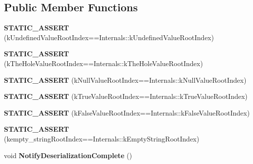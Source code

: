\subsection*{Public Member Functions}
\begin{DoxyCompactItemize}
\item 
{\bfseries S\+T\+A\+T\+I\+C\+\_\+\+A\+S\+S\+E\+RT} (k\+Undefined\+Value\+Root\+Index==Internals\+::k\+Undefined\+Value\+Root\+Index)\hypertarget{classv8_1_1internal_1_1_heap_ab0f67a64a053865074f8e45ed99540b0}{}\label{classv8_1_1internal_1_1_heap_ab0f67a64a053865074f8e45ed99540b0}

\item 
{\bfseries S\+T\+A\+T\+I\+C\+\_\+\+A\+S\+S\+E\+RT} (k\+The\+Hole\+Value\+Root\+Index==Internals\+::k\+The\+Hole\+Value\+Root\+Index)\hypertarget{classv8_1_1internal_1_1_heap_aab19977d4cc8f19126c87b7f37c05028}{}\label{classv8_1_1internal_1_1_heap_aab19977d4cc8f19126c87b7f37c05028}

\item 
{\bfseries S\+T\+A\+T\+I\+C\+\_\+\+A\+S\+S\+E\+RT} (k\+Null\+Value\+Root\+Index==Internals\+::k\+Null\+Value\+Root\+Index)\hypertarget{classv8_1_1internal_1_1_heap_afd0ebaeef72a0daef9ed75dabde6c4e1}{}\label{classv8_1_1internal_1_1_heap_afd0ebaeef72a0daef9ed75dabde6c4e1}

\item 
{\bfseries S\+T\+A\+T\+I\+C\+\_\+\+A\+S\+S\+E\+RT} (k\+True\+Value\+Root\+Index==Internals\+::k\+True\+Value\+Root\+Index)\hypertarget{classv8_1_1internal_1_1_heap_a58b9b4900b0dacd268296f68291b9cfe}{}\label{classv8_1_1internal_1_1_heap_a58b9b4900b0dacd268296f68291b9cfe}

\item 
{\bfseries S\+T\+A\+T\+I\+C\+\_\+\+A\+S\+S\+E\+RT} (k\+False\+Value\+Root\+Index==Internals\+::k\+False\+Value\+Root\+Index)\hypertarget{classv8_1_1internal_1_1_heap_aac90710331d4871a617026cd9fe6e2d3}{}\label{classv8_1_1internal_1_1_heap_aac90710331d4871a617026cd9fe6e2d3}

\item 
{\bfseries S\+T\+A\+T\+I\+C\+\_\+\+A\+S\+S\+E\+RT} (kempty\+\_\+string\+Root\+Index==Internals\+::k\+Empty\+String\+Root\+Index)\hypertarget{classv8_1_1internal_1_1_heap_a93da064dfe445f70f26445082f55014f}{}\label{classv8_1_1internal_1_1_heap_a93da064dfe445f70f26445082f55014f}

\item 
void {\bfseries Notify\+Deserialization\+Complete} ()\hypertarget{classv8_1_1internal_1_1_heap_affbf46ca54d6b120a7b8df7da2100ab7}{}\label{classv8_1_1internal_1_1_heap_affbf46ca54d6b120a7b8df7da2100ab7}


\end{DoxyCompactItemize}
